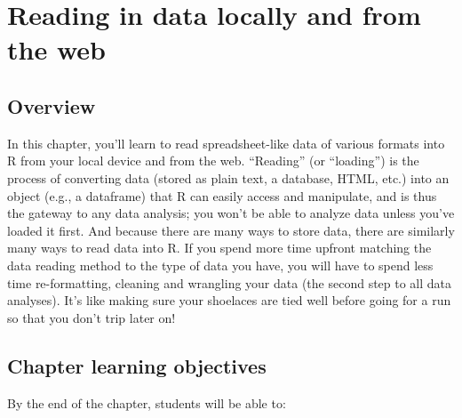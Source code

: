 \documentclass[
]{article}
\author{}
\date{\vspace{-2.5em}}
\begin{document}
\hypertarget{reading}{%
\section{Reading in data locally and from the web}\label{reading}}

\hypertarget{overview}{%
\subsection{Overview}\label{overview}}

In this chapter, you'll learn to read spreadsheet-like data of various
formats into R from your local device and from the web. ``Reading'' (or
``loading'') is the process of converting data (stored as plain text, a
database, HTML, etc.) into an object (e.g., a dataframe) that R can
easily access and manipulate, and is thus the gateway to any data
analysis; you won't be able to analyze data unless you've loaded it
first. And because there are many ways to store data, there are
similarly many ways to read data into R. If you spend more time upfront
matching the data reading method to the type of data you have, you will
have to spend less time re-formatting, cleaning and wrangling your data
(the second step to all data analyses). It's like making sure your
shoelaces are tied well before going for a run so that you don't trip
later on!

\hypertarget{chapter-learning-objectives}{%
\subsection{Chapter learning
objectives}\label{chapter-learning-objectives}}

By the end of the chapter, students will be able to:
\end{document}
